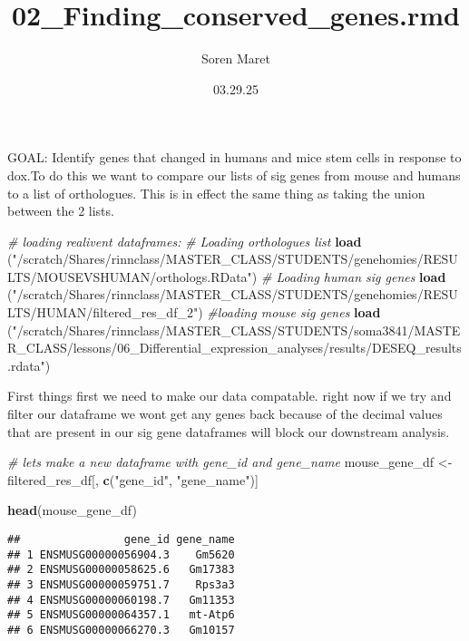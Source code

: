 \documentclass[
]{article}
\title{02\_Finding\_conserved\_genes.rmd}
\author{Soren Maret}
\date{03.29.25}
\newenvironment{Shaded}{\begin{snugshade}}{\end{snugshade}}
\newcommand{\CommentTok}[1]{\textcolor[rgb]{0.56,0.35,0.01}{\textit{#1}}}
\newcommand{\FunctionTok}[1]{\textcolor[rgb]{0.13,0.29,0.53}{\textbf{#1}}}
\newcommand{\NormalTok}[1]{#1}
\newcommand{\OtherTok}[1]{\textcolor[rgb]{0.56,0.35,0.01}{#1}}
\newcommand{\StringTok}[1]{\textcolor[rgb]{0.31,0.60,0.02}{#1}}
\begin{document}
\maketitle

GOAL: Identify genes that changed in humans and mice stem cells in
response to dox.To do this we want to compare our lists of sig genes
from mouse and humans to a list of orthologues. This is in effect the
same thing as taking the union between the 2 lists.

\begin{Shaded}
\begin{Highlighting}[]
\CommentTok{\# loading realivent dataframes:}
\CommentTok{\# Loading orthologues list}
\FunctionTok{load}\NormalTok{ (}\StringTok{"/scratch/Shares/rinnclass/MASTER\_CLASS/STUDENTS/genehomies/RESULTS/MOUSEVSHUMAN/orthologs.RData"}\NormalTok{)}
\CommentTok{\# Loading human sig genes}
\FunctionTok{load}\NormalTok{ (}\StringTok{"/scratch/Shares/rinnclass/MASTER\_CLASS/STUDENTS/genehomies/RESULTS/HUMAN/filtered\_res\_df\_2"}\NormalTok{)}
\CommentTok{\#loading mouse sig genes}
\FunctionTok{load}\NormalTok{ (}\StringTok{"/scratch/Shares/rinnclass/MASTER\_CLASS/STUDENTS/soma3841/MASTER\_CLASS/lessons/06\_Differential\_expression\_analyses/results/DESEQ\_results.rdata"}\NormalTok{)}
\end{Highlighting}
\end{Shaded}

First things first we need to make our data compatable. right now if we
try and filter our dataframe we wont get any genes back because of the
decimal values that are present in our sig gene dataframes will block
our downstream analysis.

\begin{Shaded}
\begin{Highlighting}[]
\CommentTok{\# lets make a new dataframe with gene\_id and gene\_name}
\NormalTok{mouse\_gene\_df }\OtherTok{\textless{}{-}}\NormalTok{ filtered\_res\_df[, }\FunctionTok{c}\NormalTok{(}\StringTok{"gene\_id"}\NormalTok{, }\StringTok{"gene\_name"}\NormalTok{)]}

\FunctionTok{head}\NormalTok{(mouse\_gene\_df)}
\end{Highlighting}
\end{Shaded}

\begin{verbatim}
##                gene_id gene_name
## 1 ENSMUSG00000056904.3    Gm5620
## 2 ENSMUSG00000058625.6   Gm17383
## 3 ENSMUSG00000059751.7    Rps3a3
## 4 ENSMUSG00000060198.7   Gm11353
## 5 ENSMUSG00000064357.1   mt-Atp6
## 6 ENSMUSG00000066270.3   Gm10157
\end{verbatim}
\end{document}
